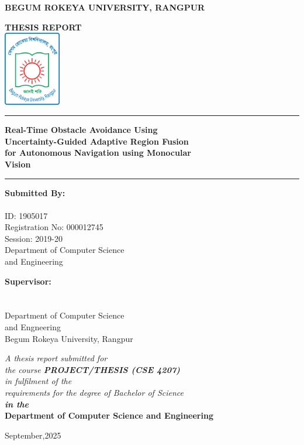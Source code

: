 \begin{titlepage}
\begin{center}
{\Large \textbf{BEGUM ROKEYA UNIVERSITY, RANGPUR}}

\vspace{1cm}
{ \textbf{THESIS REPORT}}\\
\vspace{1cm}
\includegraphics[width=2.5cm]{BRUR_Logo.svg.png}\\

\vspace{1cm}
\rule{\textwidth}{0.4pt}

\vspace{0.3cm}
{\Large \textbf{Real-Time Obstacle Avoidance Using\\
Uncertainty-Guided Adaptive Region Fusion\\
for Autonomous Navigation using Monocular\\
Vision} }
\vspace{0.3cm}

\rule{\textwidth}{0.4pt}

\vspace{1.5cm}
\begin{minipage}[t]{0.45\textwidth}
\textbf{Submitted By:}\\
\theauthor\\
ID: 1905017\\
Registration No: 000012745\\
Session: 2019-20\\
Department of Computer Science \\and Engineering
\end{minipage}
\hfill
\begin{minipage}[t]{0.45\textwidth}
\textbf{Supervisor:}\\
\thesupervisor\\
\thesupervisortitle\\
Department of Computer Science\\ and Engneering\\
Begum Rokeya University, Rangpur
\end{minipage}

\vspace{1.5cm}
\textit{A thesis report submitted for\\
the course \textbf{PROJECT/THESIS (CSE 4207)}\\
in fulfilment of the\\
requirements for the degree of Bachelor of Science\\
\textbf{in the}}\\
\large \textbf{Department of Computer Science and Engineering}

\vspace{0.5cm}
\small September,2025
\end{center}
\end{titlepage}
